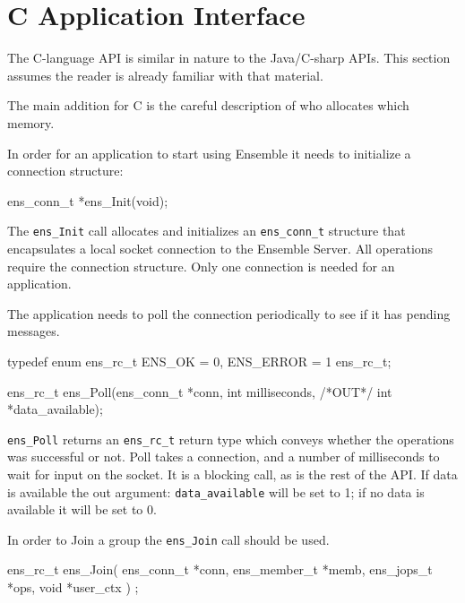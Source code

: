 %
%
%
\section{C Application Interface}
The C-language API is similar in nature to the Java/C-sharp APIs. This
section assumes the reader is already familiar with that material. 

The main addition for C is the careful description of who allocates
which memory. 

In order for an application to start using Ensemble it needs to
initialize a connection structure:
\begin{codebox}
ens_conn_t *ens_Init(void);
\end{codebox}

The {\tt ens\_Init} call allocates and initializes an {\tt ens\_conn\_t}
structure that encapsulates a local socket connection to the Ensemble
Server. All operations require the connection structure. Only one
connection is needed for an application. 

The application needs to poll the connection periodically to see if it
has pending messages. 

\begin{codebox}
typedef enum ens_rc_t {
    ENS_OK = 0,        
    ENS_ERROR = 1
} ens_rc_t;

ens_rc_t ens_Poll(ens_conn_t *conn, int milliseconds, /*OUT*/ int *data_available);
\end{codebox}

{\tt ens\_Poll} returns an {\tt ens\_rc\_t} return type which conveys
whether the operations was successful or not. Poll takes a connection,
and a number of milliseconds to wait for input on the socket. It is a
blocking call, as is the rest of the API. If data is available the out
argument: {\tt data\_available} will be set to 1; if no data is
available it will be set to 0. 

In order to Join a group the {\tt ens\_Join} call should be used. 
\begin{codebox}
ens_rc_t ens_Join(
    ens_conn_t *conn,
    ens_member_t *memb,
    ens_jops_t *ops,
    void *user_ctx
    ) ;
\end{codebox}

